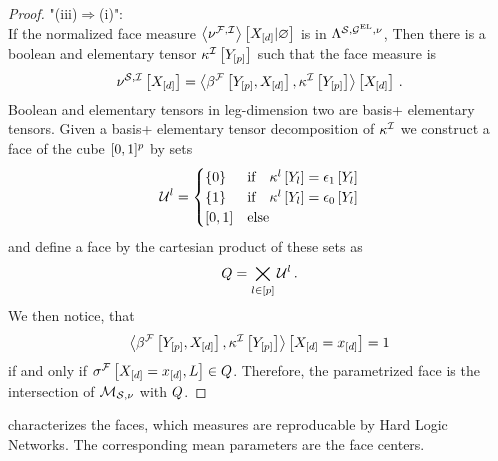 \begin{proof}
    "(iii)$\Rightarrow$(i)": \\
    If the normalized face measure $\left\langle \nu^{\mathcal{F},\mathcal{I}}\right\rangle \left[ X_{[d]} | \varnothing \right]$ is in $\Lambda^{\mathcal{S},\mathcal{G}^{\mathrm{EL}},\nu}$,
    Then there is a boolean and elementary tensor $\kappa^{\mathcal{I}}\left[Y_{[p]}\right]$ such that the face measure is
    \begin{align*}
        \nu^{\mathcal{S},\mathcal{I}}\left[X_{[d]}\right]
        = \left\langle \beta^{\mathcal{F}}\left[Y_{[p]},X_{[d]}\right],\kappa^{\mathcal{I}}\left[Y_{[p]}\right]\right\rangle \left[ X_{[d]} \right] \, .
    \end{align*}
    Boolean and elementary tensors in leg-dimension two are basis+ elementary tensors.
    Given a basis+ elementary tensor decomposition of $\kappa^{\mathcal{I}}$ we construct a face of the cube $[0,1]^{p}$ by sets
    \begin{align*}
        \mathcal{U}^{l} = \begin{cases}
                                   \{0\} & \text{if} \quad \kappa^{l}\left[Y_{l}\right] = \epsilon_1\left[Y_{l}\right] \\
                                   \{1\} & \text{if} \quad \kappa^{l}\left[Y_{l}\right] = \epsilon_0\left[Y_{l}\right] \\
                                   [0,1] & \text{else}
        \end{cases}
    \end{align*}
    and define a face by the cartesian product of these sets as
    \begin{align*}
        Q = \bigtimes_{l\in[p]} \mathcal{U}^{l} \, .
    \end{align*}
    We then notice, that
    \begin{align*}
        \left\langle \beta^{\mathcal{F}}\left[Y_{[p]},X_{[d]}\right],\kappa^{\mathcal{I}}\left[Y_{[p]}\right]\right\rangle \left[ X_{[d]}=x_{[d]} \right] = 1
    \end{align*}
    if and only if $\sigma^{\mathcal{F}}\left[X_{[d]}=x_{[d]},L\right]\in Q$.
    Therefore, the parametrized face is the intersection of $\mathcal{M}_{\mathcal{S},\nu}$ with $Q$.
\end{proof}

 characterizes the faces, which measures are reproducable by Hard Logic Networks.
The corresponding mean parameters are the face centers.


